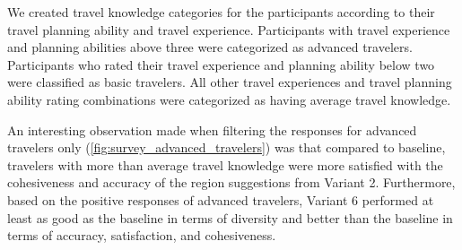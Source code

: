 \begin{table}[h]
\centering
\caption[Dunn-Bonferroni-Tests for pairwise comparison of the level of significance between the algorithm variants]{ Dunn-Bonferroni-Tests for pairwise comparison of the level of significance between the algorithm variants. It tells us which variants are statistically significantly different. Adj. p: Values adjusted with Bonferroni correction}
\label{tab:dunntest}
\end{table}

We created travel knowledge categories for the participants according to their travel planning ability and travel experience. Participants with travel experience and planning abilities above three were categorized as advanced travelers. Participants who rated their travel experience and planning ability below two were classified as basic travelers. All other travel experiences and travel planning ability rating combinations were categorized as having average travel knowledge.

An interesting observation made when filtering the responses for advanced travelers only (\ref{fig:survey_advanced_travelers}) was that compared to baseline, travelers with more than average travel knowledge were more satisfied with the cohesiveness and accuracy of the region suggestions from Variant 2. Furthermore, based on the positive responses of advanced travelers, Variant 6 performed at least as good as the baseline in terms of diversity and better than the baseline in terms of accuracy, satisfaction, and cohesiveness.

